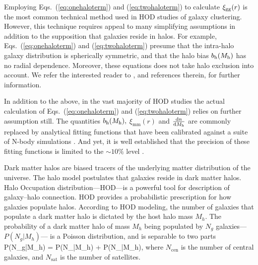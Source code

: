 Employing Eqs.~(\ref{eq:onehaloterm}) and (\ref{eq:twohaloterm}) to 
calculate $\xi_{\mathrm{gg}}(r)$ is the most common technical method used in HOD 
studies of galaxy clustering. 
However, this technique requires appeal to many simplifying assumptions 
in addition to the supposition that galaxies reside in halos. For example, 
Eqs.~(\ref{eq:onehaloterm}) and (\ref{eq:twohaloterm}) presume that 
the intra-halo galaxy distribution is spherically symmetric, and 
that the halo bias $b_{\mathrm{h}}(M_{\rm h})$ has no radial dependence. 
Moreover, these equations does not take halo exclusion into account. 
We refer the interested reader to \citet{cooray02,mo_vdb_white10,vdBosch13}, 
and references therein, for further information. 

In addition to the above, in the vast majority of HOD studies the actual calculation of 
Eqs.~(\ref{eq:onehaloterm}) and (\ref{eq:twohaloterm}) relies on further assumption still. 
The quantities $b_{\mathrm{h}}(M_{\rm h}),$ $\xi_{\mathrm{mm}}(r)$ and $\frac{\mathrm{d} n}{\mathrm{d}M_{\rm h}}$ 
are commonly replaced by analytical fitting functions that have been calibrated 
against a suite of N-body simulations \citep[e.g.,][]{sheth_tormen01,smith03,tinker05,tinker10}.   
And yet, it is well established that the precision of these fitting functions is 
limited to the $\sim10\%$ level \citep[e.g.][]{tinker08}. 




Dark matter halos are biased tracers of the underlying matter distribution of the universe. The halo model postulates that galaxies reside in dark matter halos. Halo Occupation distribution---HOD---is a powerful tool for description of galaxy--halo connection. HOD provides a probabilistic prescription for how galaxies populate halos. According to HOD modeling, the number of galaxies that populate a dark matter halo is dictated by the host halo mass $M_h$. The probability of a dark matter halo of mass $M_h$ being populated by $N_g$ galaxies---$P(N_g|M_h)$--- is a Poisson distribution, and is separable to two parts 
\beq
P(N_g|M_h) = P(N_|M_h) + P(N_|M_h),
\eeq
where $N_\mathrm{cen}$ is the number of central galaxies, and $N_\mathrm{sat}$ is the number of satellites. 

